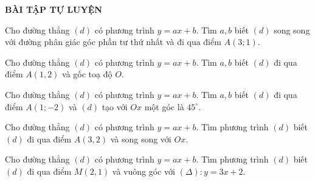 \begin{center}
	\textbf{BÀI TẬP TỰ LUYỆN}
\end{center}
\begin{bt}%
	Cho đường thẳng $(d)$ có phương trình $y=ax+b$. Tìm $a,b$ biết $(d)$ song song với đường phân giác góc phần tư thứ nhất và  đi qua điểm $A(3;1)$.
\end{bt}
\begin{bt}%
	Cho đường thẳng $(d)$ có phương trình $y=ax+b$. Tìm $a,b$ biết $(d)$ đi qua điểm $A(1,2)$ và gốc toạ độ $O$.
\end{bt}
\begin{bt}%
	Cho đường thẳng $(d)$ có phương trình $y=ax+b$. Tìm $a,b$ biết $(d)$ đi qua điểm $A(1;-2)$ và $(d)$ tạo với $Ox$ một góc là $45^\circ$.
\end{bt}
\begin{bt}%
	Cho đường thẳng $(d)$ có phương trình $y=ax+b$. Tìm phương trình $(d)$ biết $(d)$ đi qua điểm $A(3,2)$ và song song với $Ox$.
\end{bt}
\begin{bt}%
	Cho đường thẳng $(d)$ có phương trình $y=ax+b$. Tìm phương trình $(d)$ biết $(d)$ đi qua điểm $M(2,1)$ và vuông góc với $(\Delta):y=3x+2$.
\end{bt}
